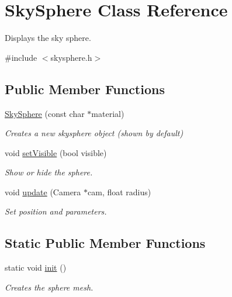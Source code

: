 \hypertarget{classSkySphere}{
\section{\-Sky\-Sphere \-Class \-Reference}
\label{db/d4d/classSkySphere}
}


\-Displays the sky sphere.  




{\ttfamily \#include $<$skysphere.\-h$>$}

\subsection*{\-Public \-Member \-Functions}
\begin{DoxyCompactItemize}
\item 
\hypertarget{classSkySphere_af5fcc1abe996fa251d05909d112a36b2}{
\hyperlink{classSkySphere_af5fcc1abe996fa251d05909d112a36b2}{\-Sky\-Sphere} (const char $\ast$material)}
\label{db/d4d/classSkySphere_af5fcc1abe996fa251d05909d112a36b2}

\begin{DoxyCompactList}\small\item\em \-Creates a new skysphere object (shown by default) \end{DoxyCompactList}\item 
\hypertarget{classSkySphere_abd59103a5a62e10ed993208b64e745ac}{
void \hyperlink{classSkySphere_abd59103a5a62e10ed993208b64e745ac}{set\-Visible} (bool visible)}
\label{db/d4d/classSkySphere_abd59103a5a62e10ed993208b64e745ac}

\begin{DoxyCompactList}\small\item\em \-Show or hide the sphere. \end{DoxyCompactList}\item 
\hypertarget{classSkySphere_a519ed70b5dfa47af6e90e391d97c532c}{
void \hyperlink{classSkySphere_a519ed70b5dfa47af6e90e391d97c532c}{update} (\-Camera $\ast$cam, float radius)}
\label{db/d4d/classSkySphere_a519ed70b5dfa47af6e90e391d97c532c}

\begin{DoxyCompactList}\small\item\em \-Set position and parameters. \end{DoxyCompactList}\end{DoxyCompactItemize}
\subsection*{\-Static \-Public \-Member \-Functions}
\begin{DoxyCompactItemize}
\item 
\hypertarget{classSkySphere_a314f11e49ac7002651c41bf1da9f336c}{
static void \hyperlink{classSkySphere_a314f11e49ac7002651c41bf1da9f336c}{init} ()}
\label{db/d4d/classSkySphere_a314f11e49ac7002651c41bf1da9f336c}

\begin{DoxyCompactList}\small\item\em \-Creates the sphere mesh. \end{DoxyCompactList}\end{DoxyCompactItemize}
